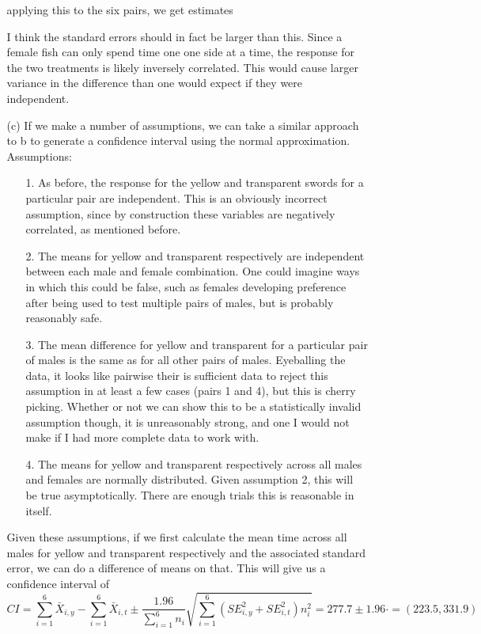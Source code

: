 \documentclass[11pt]{article}
\theoremstyle{definition}
\begin{document}
\begin{itemize}
\begin{itemize}
                applying this to the six pairs, we get estimates 
                \FloatBarrier
                
                \FloatBarrier
                I think the standard errors should in fact be larger than this. Since a female fish can only spend time one one side at a time, the response for the two treatments is likely inversely correlated. This would cause larger variance in the difference than one would expect if they were independent.
            \item[(c)]
                If we make a number of assumptions, we can take a similar approach to b to generate a confidence interval using the normal approximation. Assumptions:
                \begin{itemize}
                    \item[1.] As before, the response for the yellow and transparent swords for a particular pair are independent. This is an obviously incorrect assumption, since by construction these variables are negatively correlated, as mentioned before.
                    \item[2.] The means for yellow and transparent respectively are independent between each male and female combination. One could imagine ways in which this could be false, such as females developing preference after being used to test multiple pairs of males, but is probably reasonably safe.
                    \item[3.] The mean difference for yellow and transparent for a particular pair of males is the same as for all other pairs of males. Eyeballing the data, it looks like pairwise their is sufficient data to reject this assumption in at least a few cases (pairs 1 and 4), but this is cherry picking. Whether or not we can show this to be a statistically invalid assumption though, it is unreasonably strong, and one I would not make if I had more complete data to work with.
                    \item[4.] The means for yellow and transparent respectively across all males and females are normally distributed. Given assumption 2, this will be true asymptotically. There are enough trials this is reasonable in itself.
                \end{itemize}
                Given these assumptions, if we first calculate the mean time across all males for yellow and transparent respectively and the associated standard error, we can do a difference of means on that. This will give us a confidence interval of
                \[CI=\sum_{i=1}^6 \bar X_{i,y} - \sum_{i=1}^6 \bar X_{i,t} \pm \frac{1.96}{\sum_{i=1}^6 n_i}\sqrt{\sum_{i=1}^6\left(SE_{i,y}^2+SE_{i,t}^2\right)  n_i^2}=277.7\pm1.96\cdot=(223.5,331.9)\]

\end{itemize}
\end{itemize}
\end{document}
